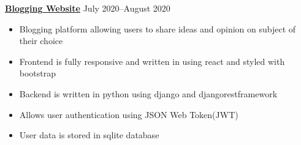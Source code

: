 \textbf{\href{https://github.com/KoushikSahu/blogging-website}{Blogging Website}} \hfill July 2020--August 2020 \par
\begin{itemize}
	\item Blogging platform allowing users to share ideas and opinion on subject of their choice
	\item Frontend is fully responsive and written in using react and styled with bootstrap
	\item Backend is written in python using django and djangorestframework
	\item Allows user authentication using JSON Web Token(JWT)
	\item User data is stored in sqlite database
\end{itemize}\vspace{0.1cm} \par